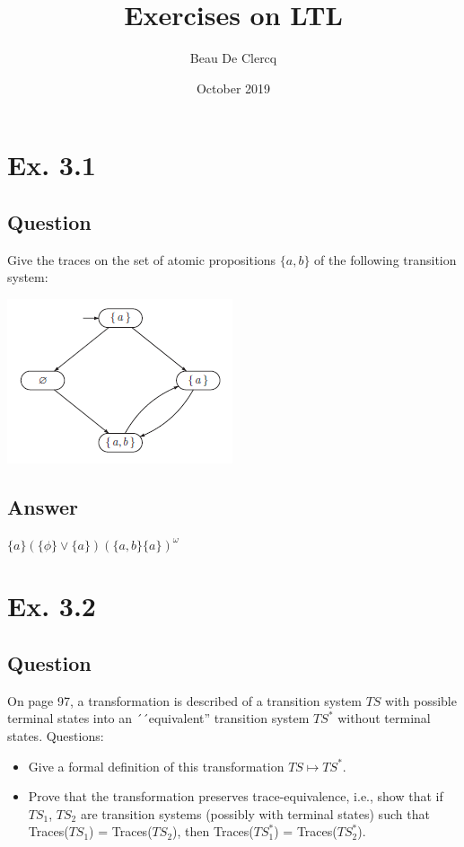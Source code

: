 \documentclass[12pt]{article}
\title{Exercises on LTL}
\author{Beau De Clercq}
\date{October 2019}
\begin{document}
\maketitle{}


\clearpage
\newpage

\section*{Ex. 3.1}
\subsection*{Question}
Give the traces on the set of atomic propositions $\{a,b\}$ of the following transition
system:\\
\begin{centering}
	\includegraphics[]{ex31.PNG}
\end{centering}

\subsection*{Answer}
$\{a\}(\{\phi\}\vee\{a\})(\{a,b\}\{a\})^\omega$
\newpage
\section*{Ex. 3.2}
\subsection*{Question}
On page 97, a transformation is described of a transition system $TS$ with possible
terminal states into an ´´equivalent'' transition system $TS^*$ without terminal states. Questions:
\begin{itemize}
	\item Give a formal definition of this transformation $TS \mapsto TS^*$.
	\item Prove that the transformation preserves trace-equivalence, i.e., show that if $TS_1$, $TS_2$ are
	transition systems (possibly with terminal states) such that Traces($TS_1$) = Traces($TS_2$),
	then Traces($TS^*_1$) = Traces($TS^*_2$).
\end{itemize}
\end{document}
